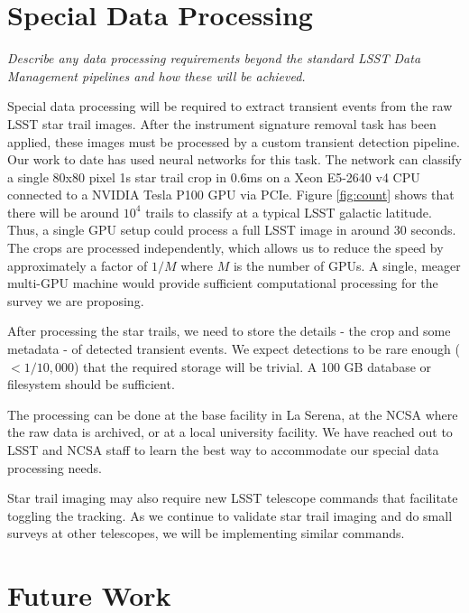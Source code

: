 \documentclass[12pt, letterpaper]{article}
\begin{document}
\vspace{.6in}

\section{Special Data Processing}
\begin{footnotesize}
{\it Describe any data processing requirements beyond the standard LSST Data Management pipelines and how these will be achieved.}
\end{footnotesize}

Special data processing will be required to extract transient events from the raw LSST star trail images. After the instrument signature removal task has been applied, these images must be processed by a custom transient detection pipeline. Our work to date has used neural networks for this task. The network can classify a single 80x80 pixel 1s star trail crop in 0.6ms on a Xeon E5-2640 v4 CPU connected to a NVIDIA Tesla P100 GPU via PCIe. Figure \ref{fig:count} shows that there will be around $10^4$ trails to classify at a typical LSST galactic latitude. Thus, a single GPU setup could process a full LSST image in around 30 seconds. The crops are processed independently, which allows us to reduce the speed by approximately a factor of $1/M$ where $M$ is the number of GPUs. A single, meager multi-GPU machine would provide sufficient computational processing for the survey we are proposing.

After processing the star trails, we need to store the details - the crop and some metadata - of detected transient events. We expect detections to be rare enough ($< 1/10,000$) that the required storage will be trivial. A 100 GB database or filesystem should be sufficient. 

The processing can be done at the base facility in La Serena, at the NCSA where the raw data is archived, or at a local university facility. We have reached out to LSST and NCSA staff to learn the best way to accommodate our special data processing needs.

Star trail imaging may also require new LSST telescope commands that facilitate toggling the tracking. As we continue to validate star trail imaging and do small surveys at other telescopes, we will be implementing similar commands.

\section{Future Work}
\label{sec:future}
\end{document}
